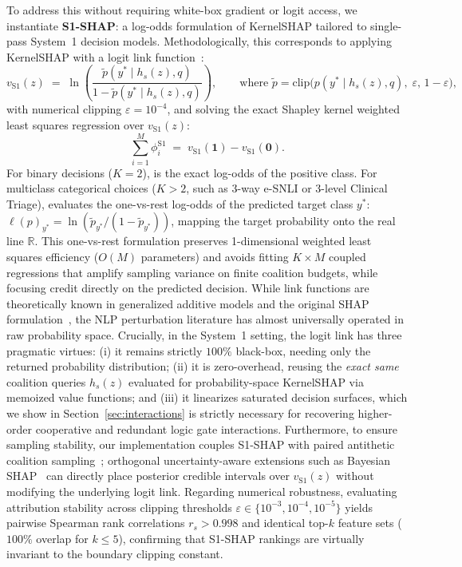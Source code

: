 \documentclass[10pt]{article}
\begin{document}
To address this without requiring white-box gradient or logit access, we instantiate \textbf{S1-SHAP}: a log-odds formulation of KernelSHAP tailored to single-pass System~1 decision models.
Methodologically, this corresponds to applying KernelSHAP with a logit link function~\cite{lundberg2017}:
\begin{equation}
v_{\text{S1}}(z) \;=\; \ln\!\left(\frac{\tilde{p}(y^* \mid h_s(z), q)}{1 - \tilde{p}(y^* \mid h_s(z), q)}\right), \qquad \text{where } \tilde{p} = \text{clip}\big(p(y^* \mid h_s(z), q),\; \varepsilon,\, 1-\varepsilon\big),
\label{eq:s1shap}
\end{equation}
with numerical clipping $\varepsilon = 10^{-4}$, and solving the exact Shapley kernel weighted least squares regression over $v_{\text{S1}}(z)$:
\begin{equation}
\sum_{i=1}^M \phi_i^{\text{S1}} \;=\; v_{\text{S1}}(\mathbf{1}) - v_{\text{S1}}(\mathbf{0}).
\end{equation}
For binary decisions ($K=2$),  is the exact log-odds of the positive class.
For multiclass categorical choices ($K > 2$, such as 3-way e-SNLI or 3-level Clinical Triage),  evaluates the one-vs-rest log-odds of the predicted target class $y^*$: $\ell(p)_{y^*} = \ln(\tilde{p}_{y^*} / (1 - \tilde{p}_{y^*}))$, mapping the target probability onto the real line $\mathbb{R}$.
This one-vs-rest formulation preserves 1-dimensional weighted least squares efficiency ($O(M)$ parameters) and avoids fitting $K \times M$ coupled regressions that amplify sampling variance on finite coalition budgets, while focusing credit directly on the predicted decision.
While link functions are theoretically known in generalized additive models and the original SHAP formulation~\cite{lundberg2017}, the NLP perturbation literature has almost universally operated in raw probability space.
Crucially, in the System~1 setting, the logit link has three pragmatic virtues:
(i) it remains strictly $100\%$ black-box, needing only the returned probability distribution;
(ii) it is zero-overhead, reusing the \emph{exact same} coalition queries $h_s(z)$ evaluated for probability-space KernelSHAP via memoized value functions; and
(iii) it linearizes saturated decision surfaces, which we show in Section~\ref{sec:interactions} is strictly necessary for recovering higher-order cooperative and redundant logic gate interactions.
Furthermore, to ensure sampling stability, our implementation couples S1-SHAP with paired antithetic coalition sampling~\cite{covert2021explaining}; orthogonal uncertainty-aware extensions such as Bayesian SHAP~\cite{visani2022statistical,slack2021reliable} can directly place posterior credible intervals over $v_{\text{S1}}(z)$ without modifying the underlying logit link.
Regarding numerical robustness, evaluating attribution stability across clipping thresholds $\varepsilon \in \{10^{-3}, 10^{-4}, 10^{-5}\}$ yields pairwise Spearman rank correlations $r_s > 0.998$ and identical top-$k$ feature sets ($100\%$ overlap for $k \le 5$), confirming that S1-SHAP rankings are virtually invariant to the boundary clipping constant.
\end{document}
